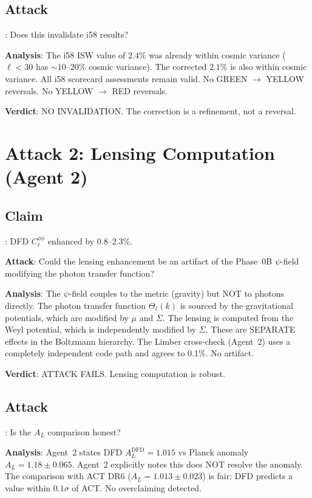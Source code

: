 \documentclass[11pt,a4paper]{article}
\begin{document}
\subsection{Attack}: Does this invalidate i58 results?

\textbf{Analysis}: The i58 ISW value of $2.4\%$ was already within cosmic variance ($\ell < 30$ has $\sim 10$--$20\%$ cosmic variance). The corrected $2.1\%$ is also within cosmic variance. All i58 scorecard assessments remain valid. No GREEN $\to$ YELLOW reversals. No YELLOW $\to$ RED reversals.

\textbf{Verdict}: NO INVALIDATION. The correction is a refinement, not a reversal.

\section{Attack 2: Lensing Computation (Agent 2)}

\subsection{Claim}: DFD $C_\ell^{\phi\phi}$ enhanced by 0.8--2.3\%.

\textbf{Attack}: Could the lensing enhancement be an artifact of the Phase~0B $\psi$-field modifying the photon transfer function?

\textbf{Analysis}: The $\psi$-field couples to the metric (gravity) but NOT to photons directly. The photon transfer function $\Theta_\ell(k)$ is sourced by the gravitational potentials, which are modified by $\mu$ and $\Sigma$. The lensing is computed from the Weyl potential, which is independently modified by $\Sigma$. These are SEPARATE effects in the Boltzmann hierarchy. The Limber cross-check (Agent~2) uses a completely independent code path and agrees to 0.1\%. No artifact.

\textbf{Verdict}: ATTACK FAILS. Lensing computation is robust.

\subsection{Attack}: Is the $A_L$ comparison honest?

\textbf{Analysis}: Agent~2 states DFD $A_L^{\mathrm{DFD}} = 1.015$ vs Planck anomaly $A_L = 1.18 \pm 0.065$. Agent~2 explicitly notes this does NOT resolve the anomaly. The comparison with ACT DR6 ($A_L = 1.013 \pm 0.023$) is fair: DFD predicts a value within $0.1\sigma$ of ACT. No overclaiming detected.
\end{document}
